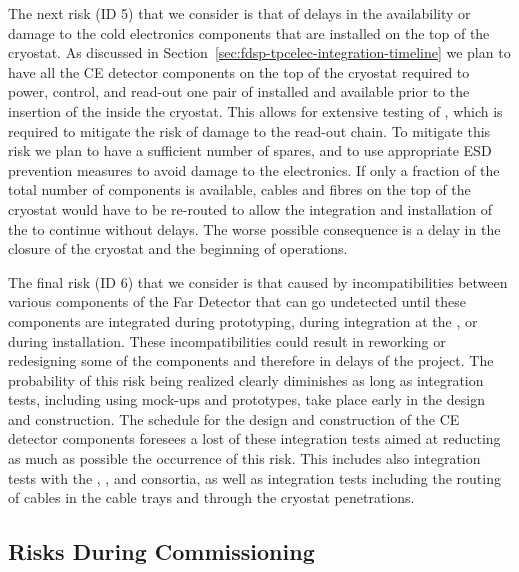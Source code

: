 The next risk (ID 5) that we consider is that of delays in the availability or
damage to the cold electronics components that are installed on the top of the
cryostat. As discussed in Section~\ref{sec:fdsp-tpcelec-integration-timeline}
we plan to have all the CE detector components on the top of the cryostat 
required to power, control, and read-out one pair of  installed
and available prior to the insertion of the  inside the cryostat.
This allows for extensive testing of , which is required to mitigate
the risk of damage to the read-out chain. To mitigate this risk we plan to have
a sufficient number of spares, and to use appropriate ESD prevention measures
to avoid damage to the electronics. If only a fraction of the total 
number of components is available, cables and fibres on the top of the cryostat
would have to be re-routed to allow the integration and installation of the
 to continue without delays. The worse possible consequence is a 
delay in the closure of the cryostat and the beginning of operations. 

The final risk (ID 6) that we consider is that caused by incompatibilities 
between various components of the Far Detector that can go undetected until
these components are integrated during prototyping, during integration at 
the , or during installation. These incompatibilities could 
result in reworking or redesigning some of the components and therefore in
delays of the project. The probability of this risk being realized clearly
diminishes as long as integration tests, including using mock-ups and prototypes,
take place early in the design and construction. The schedule for the 
design and construction of the CE detector components foresees a lost of
these integration tests aimed at reducting as much as possible the occurrence
of this risk. This includes also integration tests with the ,
, and  consortia, as well as integration tests
including the routing of cables in the cable trays and through the cryostat
penetrations. 

\subsection{Risks During Commissioning}
\label{sec:fdsp-tpcelec-risks-commissioning}

